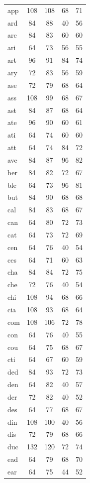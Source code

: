 \documentclass[ms,electronic,twosidetoc,letterpaper,chaptercenter,parttop,lof,lot]{byumsphd}
\begin{document}
\begin{longtable}{| l | c c | c c |}
  app & 108 & 108 & 68 & 71 \\
  ard & 84 & 88 & 40 & 56 \\
  are & 84 & 83 & 60 & 60 \\
  ari & 64 & 73 & 56 & 55 \\
  art & 96 & 91 & 84 & 74 \\
  ary & 72 & 83 & 56 & 59 \\
  ase & 72 & 79 & 68 & 64 \\
  ass & 108 & 99 & 68 & 67 \\
  ast & 84 & 87 & 68 & 64 \\
  ate & 96 & 90 & 60 & 61 \\
  ati & 64 & 74 & 60 & 60 \\
  att & 64 & 74 & 84 & 72 \\
  ave & 84 & 87 & 96 & 82 \\
  ber & 84 & 82 & 72 & 67 \\
  ble & 64 & 73 & 96 & 81 \\
  but & 84 & 90 & 68 & 68 \\
  cal & 84 & 83 & 68 & 67 \\
  can & 64 & 80 & 72 & 73 \\
  cat & 64 & 73 & 72 & 69 \\
  cen & 64 & 76 & 40 & 54 \\
  ces & 64 & 71 & 60 & 63 \\
  cha & 84 & 84 & 72 & 75 \\
  che & 72 & 76 & 40 & 54 \\
  chi & 108 & 94 & 68 & 66 \\
  cia & 108 & 93 & 68 & 64 \\
  com & 108 & 106 & 72 & 78 \\
  con & 64 & 76 & 40 & 55 \\
  cou & 64 & 75 & 68 & 67 \\
  cti & 64 & 67 & 60 & 59 \\
  ded & 84 & 93 & 72 & 73 \\
  den & 64 & 82 & 40 & 57 \\
  der & 72 & 82 & 40 & 52 \\
  des & 64 & 77 & 68 & 67 \\
  din & 108 & 100 & 40 & 56 \\
  dis & 72 & 79 & 68 & 66 \\
  duc & 132 & 120 & 72 & 74 \\
  ead & 64 & 79 & 68 & 70 \\
  ear & 64 & 75 & 44 & 52 \\

\end{longtable}
\end{document}
